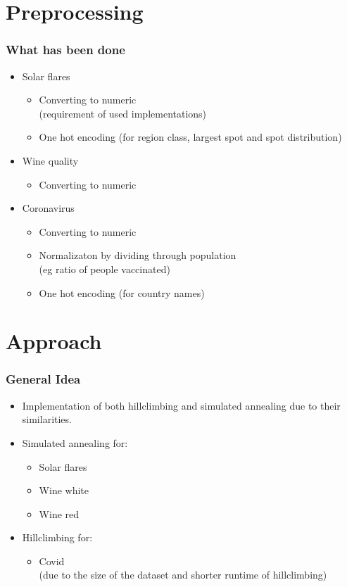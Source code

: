 \documentclass{beamer}
\begin{document}
\section{Preprocessing}
\frame
{
  \frametitle{What has been done}
  \begin{itemize}
    \item Solar flares
    \begin{itemize}
      \item Converting to numeric\\ (requirement of used implementations)
      \item One hot encoding (for region class, largest spot and spot distribution)
    \end{itemize}
    \item Wine quality
    \begin{itemize}
      \item Converting to numeric
    \end{itemize}
    \item Coronavirus
    \begin{itemize}
      \item Converting to numeric
      \item Normalizaton by dividing through population\\ (eg ratio of people vaccinated)
      \item One hot encoding (for country names)
    \end{itemize}
  \end{itemize}
}

\section{Approach}

\frame
{
  \frametitle{General Idea}

  \begin{itemize}
    \item Implementation of both hillclimbing and simulated annealing due to their similarities.
    \item Simulated annealing for:
      \begin{itemize}
        \item Solar flares
        \item Wine white
        \item Wine red
      \end{itemize}
    \item Hillclimbing for:
      \begin{itemize}
        \item Covid \\ (due to the size of the dataset and shorter runtime of hillclimbing)
      \end{itemize}
  \end{itemize}
}
\end{document}
